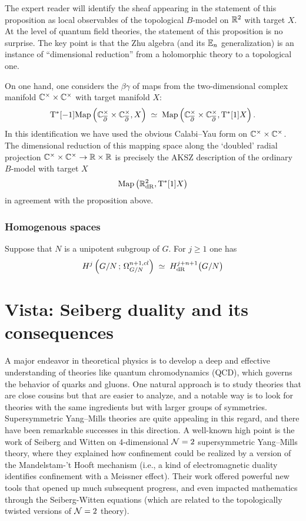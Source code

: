 \documentclass[11pt]{amsart}
\begin{document}
The expert reader will identify the sheaf appearing in the statement of this proposition as local observables of the topological $B$-model on $\mathbb R^2$ with target $X$. 
At the level of quantum field theories, the statement of this proposition is no surprise. 
The key point is that the Zhu algebra (and its $\mathbb E_n$ generalization) is an instance of ``dimensional reduction'' from a holomorphic theory to a topological one. 

On one hand, one considers the $\beta\gamma$ of maps from the two-dimensional complex manifold $\mathbb C^\times \times \mathbb C^\times$ with target manifold $X$:
\[
{\rm T}^*[-1] {\rm Map}\left(\mathbb C_{\overline{\partial}}^\times \times \mathbb C_{\overline{\partial}}^\times , X\right) \; \simeq \; {\rm Map}\left(\mathbb C_{\overline{\partial}}^\times \times \mathbb C_{\overline{\partial}}^\times , {\rm T}^*[1] X\right) .
\]
In this identification we have used the obvious Calabi--Yau form on $\mathbb C^\times \times \mathbb C^\times$. 
The dimensional reduction of this mapping space along the `doubled' radial projection $\mathbb C^\times \times \mathbb C^\times \to \mathbb R \times \mathbb R$ is precisely the AKSZ description of the ordinary $B$-model with target $X$
\[
{\rm Map}\left(\mathbb R^2_{\rm dR} , {\rm T}^*[1] X\right)
\]
in agreement with the proposition above.


\subsubsection{Homogenous spaces}

Suppose that $N$ is a unipotent subgroup of $G$.
For $j \geq 1$ one has
\[
H^j \left( G / N \, ; \, \Omega^{n+1,cl}_{G/N} \right) \; \simeq \; H_{\rm dR}^{j+n+1} \big(G / N \big)
\]


\section{Vista: Seiberg duality and its consequences}
\label{sec: seiberg}

A major endeavor in theoretical physics is to develop a deep and effective understanding of theories like quantum chromodynamics (QCD), which governs the behavior of quarks and gluons.
One natural approach is to study theories that are close cousins but that are easier to analyze,
and a notable way is to look for theories with the same ingredients but with larger groups of symmetries.
Supersymmetric Yang--Mills theories are quite appealing in this regard,
and there have been remarkable successes in this direction.
A well-known high point is the work of Seiberg and Witten on 4-dimensional $\mathcal N =2$ supersymmetric Yang--Mills theory,
where they explained how confinement could be realized by a version of the Mandelstam-'t Hooft mechanism (i.e., a kind of electromagnetic duality identifies confinement with a Meissner effect).
Their work offered powerful new tools that opened up much subsequent progress,
and even impacted mathematics through the Seiberg-Witten equations (which are related to the topologically twisted versions of $\mathcal N=2$ theory).
\end{document}
